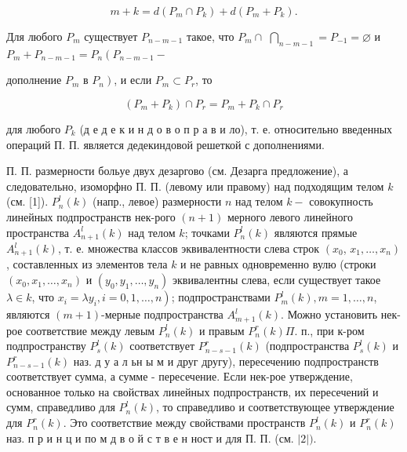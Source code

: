 \documentclass[10pt]{article}
\begin{document}
\[

m+k=d\left(P_{m} \cap P_{k}\right)+d\left(P_{m}+P_{k}\right) .

\]



Для любого $P_{m}$ существует $P_{n-m-1}$ такое, что $P_{m} \cap$ $\bigcap_{n-m-1}=P_{-1}=\varnothing$ и $P_{m}+P_{n-m-1}=P_{n}\left(P_{n-m-1}-\right.$

дополнение $P_{m}$ в $\left.P_{n}\right)$, и если $P_{m} \subset P_{r}$, то



\[

\left(P_{m}+P_{k}\right) \cap P_{r}=P_{m}+P_{k} \cap P_{r}

\]



для любого $P_{k}$ (д е д е к и н д о в о п р а в и ло), т. е. относительно введенных операций П. П. является дедекиндовой решеткой с дополнениями.



П. П. размерности больуе двух дезаргово (см. Дезарга предложение), а следовательно, изоморфно П. П. (левому или правому) над подходящим телом $k$ (см. [1]). $P_{n}^{l}(k)$ (напр., левое) размерности $n$ над телом $k-$ совокупность линейных подпространств нек-рого $(n+1)$ мерного левого линейного пространства $A_{n+1}^{l}(k)$ над телом $k$; точками $P_{n}^{l}(k)$ являются прямые $A_{n+1}^{l}(k)$, т. е. множества классов эквивалентности слева строк $\left(x_{0}\right.$, $\left.x_{1}, \ldots, x_{n}\right)$, составленных из элементов тела $k$ и не равных одновременно вулю (строки $\left(x_{0}, x_{1}, \ldots, x_{n}\right)$ и $\left(y_{0}, y_{1}, \ldots, y_{n}\right)$ эквивалентны слева, если существует такое $\lambda \in k$, что $\left.x_{i}=\lambda y_{i}, i=0,1, \ldots, n\right)$; подпространствами $P_{m}^{l}(k), m=1, \ldots, n$, являются $(m+1)$-мерные подпространства $A_{m+1}^{l}(k)$. Можно установить нек-рое соответствие между левым $P_{n}^{l}(k)$ и правым $P_{n}^{r}(k) \Pi$. п., при к-ром подпространству $P_{s}^{l}(k)$ соответствует $P_{n-s-1}^{r}(k)$ (подпространства $P_{s}^{l}(k)$ и $P_{n-s-1}^{r}(k)$ наз. д у а л ьн ы м и друг другу), пересечению подпространств соответствует сумма, а сумме - пересечение. Если нек-рое утверждение, основанное только на свойствах линейных подпространств, их пересечений и сумм, справедливо для $P_{n}^{l}(k)$, то справедливо и соответствующее утверждение для $P_{n}^{r}(k)$. Это соответствие между свойствами пространств $P_{n}^{l}(k)$ и $P_{n}^{r}(k)$ наз. п р и н ц и по м д в о й с т в е н ност и для П. П. (см. $|2|)$.
\end{document}
